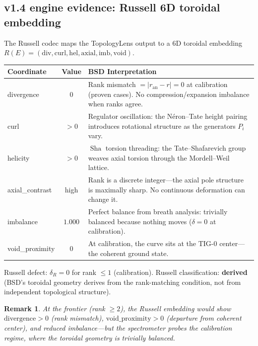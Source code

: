 \documentclass[11pt]{article}
\newtheorem{remark}[theorem]{Remark}
\DeclareMathOperator{\Sha}{Sha}
\begin{document}
\subsection{v1.4 engine evidence: Russell 6D toroidal embedding}
\label{sec:russell-bsd}

The Russell codec maps the TopologyLens output to a 6D toroidal embedding
$R(E) = (\mathrm{div}, \mathrm{curl}, \mathrm{hel}, \mathrm{axial},
\mathrm{imb}, \mathrm{void})$.

\begin{center}
\begin{tabular}{lcp{7cm}}
\hline
\textbf{Coordinate} & \textbf{Value} & \textbf{BSD Interpretation} \\
\hline
divergence & $0$ & Rank mismatch $= |r_{\mathrm{an}} - r| = 0$ at calibration
  (proven cases).  No compression/expansion imbalance when ranks agree. \\
curl & $> 0$ & Regulator oscillation: the N\'eron--Tate height pairing
  introduces rotational structure as the generators $P_i$ vary. \\
helicity & $> 0$ & $\Sha$ torsion threading: the Tate--Shafarevich group
  weaves axial torsion through the Mordell--Weil lattice. \\
axial\_contrast & high & Rank is a discrete integer---the axial pole
  structure is maximally sharp.  No continuous deformation can change it. \\
imbalance & $1.000$ & Perfect balance from breath analysis: trivially
  balanced because nothing moves ($\delta = 0$ at calibration). \\
void\_proximity & $0$ & At calibration, the curve sits at the TIG-0
  center---the coherent ground state. \\
\hline
\end{tabular}
\end{center}

\noindent
Russell defect: $\delta_R = 0$ for rank $\leq 1$ (calibration).
Russell classification: \textbf{derived} (BSD's toroidal geometry derives from
the rank-matching condition, not from independent topological structure).

\begin{remark}
At the frontier (rank $\geq 2$), the Russell embedding would show
$\mathrm{divergence} > 0$ (rank mismatch), $\mathrm{void\_proximity} > 0$
(departure from coherent center), and reduced imbalance---but the spectrometer
probes the calibration regime, where the toroidal geometry is trivially balanced.
\end{remark}
\end{document}
